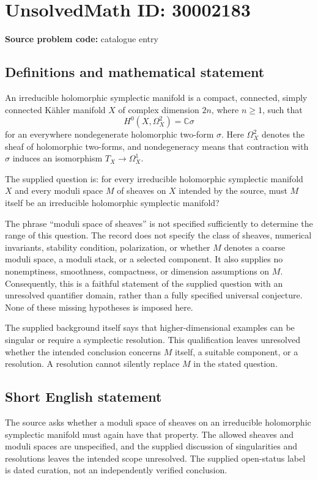 \documentclass[11pt]{article}
\newcommand{\C}{\mathbb{C}}
\begin{document}
\section*{UnsolvedMath ID: 30002183}
\textbf{Source problem code:} catalogue entry
\subsection{Definitions and mathematical statement}
An irreducible holomorphic symplectic manifold is a compact, connected, simply connected K\"ahler manifold \(X\) of complex dimension \(2n\), where \(n\geq 1\), such that
\[
H^0(X,\Omega_X^2)=\C\sigma
\]
for an everywhere nondegenerate holomorphic two-form \(\sigma\). Here \(\Omega_X^2\) denotes the sheaf of holomorphic two-forms, and nondegeneracy means that contraction with \(\sigma\) induces an isomorphism \(T_X\to\Omega_X^1\).

The supplied question is: for every irreducible holomorphic symplectic manifold \(X\) and every moduli space \(M\) of sheaves on \(X\) intended by the source, must \(M\) itself be an irreducible holomorphic symplectic manifold?

The phrase ``moduli space of sheaves'' is not specified sufficiently to determine the range of this question. The record does not specify the class of sheaves, numerical invariants, stability condition, polarization, or whether \(M\) denotes a coarse moduli space, a moduli stack, or a selected component. It also supplies no nonemptiness, smoothness, compactness, or dimension assumptions on \(M\). Consequently, this is a faithful statement of the supplied question with an unresolved quantifier domain, rather than a fully specified universal conjecture. None of these missing hypotheses is imposed here.

The supplied background itself says that higher-dimensional examples can be singular or require a symplectic resolution. This qualification leaves unresolved whether the intended conclusion concerns \(M\) itself, a suitable component, or a resolution. A resolution cannot silently replace \(M\) in the stated question.
\subsection{Short English statement}
The source asks whether a moduli space of sheaves on an irreducible holomorphic symplectic manifold must again have that property. The allowed sheaves and moduli spaces are unspecified, and the supplied discussion of singularities and resolutions leaves the intended scope unresolved. The supplied open-status label is dated curation, not an independently verified conclusion.
\end{document}
